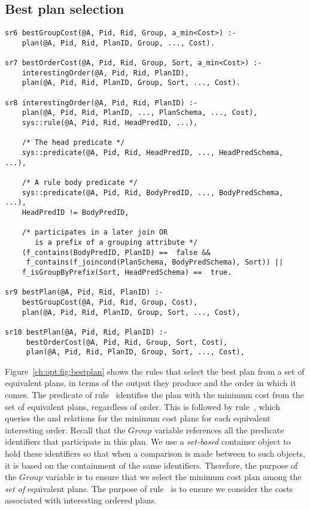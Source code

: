 \subsection{Best plan selection}
\label{ch:opt:sec:bestplan}

\begin{figure*}
\ssp
\centering
\begin{lstlisting}
sr6 bestGroupCost(@A, Pid, Rid, Group, a_min<Cost>) :-
    plan(@A, Pid, Rid, PlanID, Group, ..., Cost).

sr7 bestOrderCost(@A, Pid, Rid, Group, Sort, a_min<Cost>) :-
    interestingOrder(@A, Pid, Rid, PlanID),
    plan(@A, Pid, Rid, PlanID, Group, Sort, ..., Cost).

sr8 interestingOrder(@A, Pid, Rid, PlanID) :-
    plan(@A, Pid, Rid, PlanID, ..., PlanSchema, ..., Cost),
    sys::rule(@A, Pid, Rid, HeadPredID, ...),

    /* The head predicate */
    sys::predicate(@A, Pid, Rid, HeadPredID, ..., HeadPredSchema, ...),

    /* A rule body predicate */
    sys::predicate(@A, Pid, Rid, BodyPredID, ..., BodyPredSchema, ...),
    HeadPredID != BodyPredID,

    /* participates in a later join OR 
       is a prefix of a grouping attribute */
    (f_contains(BodyPredID, PlanID) ==  false && 
     f_contains(f_joincond(PlanSchema, BodyPredSchema), Sort)) ||
    f_isGroupByPrefix(Sort, HeadPredSchema) ==  true.

sr9 bestPlan(@A, Pid, Rid, PlanID) :-
    bestGroupCost(@A, Pid, Rid, Group, Cost),
    plan(@A, Pid, Rid, PlanID, Group, Sort, ..., Cost),

sr10 bestPlan(@A, Pid, Rid, PlanID) :-
     bestOrderCost(@A, Pid, Rid, Group, Sort, Cost),
     plan(@A, Pid, Rid, PlanID, Group, Sort, ..., Cost),
\end{lstlisting}
\caption{\label{ch:opt:fig:bestplan}Best plan selection.}
\end{figure*}

Figure~\ref{ch:opt:fig:bestplan} shows the rules that select the best plan from
a set of equivalent plans, in terms of the output they produce and the order in
which it comes.  The  predicate of rule~ identifies
the plan with the minimum cost from the set of equivalent plans, regardless of
order.  This is followed by rule~, which queries the  and
 relations for the minimum cost plans for each equivalent
interesting order.  Recall that the $Group$ variable references all the
predicate identifiers that participate in this plan.  We use a {\em set-based}
container object to hold these identifiers so that when a comparison is made
between to such objects, it is based on the containment of the same
identifiers.  Therefore, the purpose of the $Group$ variable is to ensure that
we select the minimum cost plan among the {\em set of} equivalent plans.  The
purpose of rule~ is to ensure we consider the costs associated with
interesting ordered plans.

